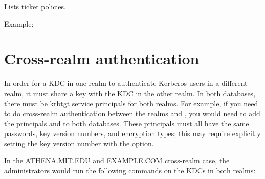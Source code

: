 \documentclass[letterpaper,10pt,english]{sphinxmanual}
\begin{document}
Lists ticket policies.

Example:

%
\begin{sphinxVerbatim}[commandchars=\\\{\}]
    
      
  
\end{sphinxVerbatim}


\section{Cross-realm authentication}
\label{\detokenize{admin/database:cross-realm-authentication}}\label{\detokenize{admin/database:xrealm-authn}}
In order for a KDC in one realm to authenticate Kerberos users in a
different realm, it must share a key with the KDC in the other realm.
In both databases, there must be krbtgt service principals for both realms.
For example, if you need to do cross-realm authentication between the realms
 and , you would need to add the
principals  and
 to both databases.
These principals must all have the same passwords, key version
numbers, and encryption types; this may require explicitly setting
the key version number with the  option.

In the ATHENA.MIT.EDU and EXAMPLE.COM cross-realm case, the administrators
would run the following commands on the KDCs in both realms:
\end{document}
